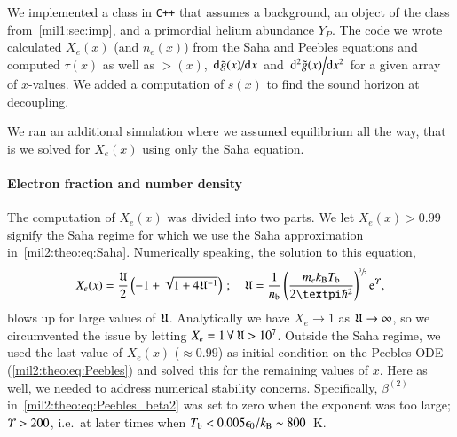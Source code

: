 

We implemented a class in \verb|C++| that assumes a background, an object of the class from~\cref{mil1:sec:imp}, and a primordial helium abundance $Y_P$. The code we wrote calculated $X_e(x)$ (and $n_e(x)$) from the Saha and Peebles equations and computed $\tau(x)$ as well as $\gt(x)$, $\dv*[]{\tilde{g}(x)}{x}$ and $\dv*[2]{\tilde{g}(x)}{x}$ for a given array of $x$-values. We added a computation of $s(x)$ to find the sound horizon at decoupling.

We ran an additional simulation where we assumed equilibrium all the way, that is we solved for $X_e(x)$ using only the Saha equation. 

\paragraph{Electron fraction and number density}
    The computation of $X_e(x)$ was divided into two parts. We let $X_e(x)>0.99$ signify the Saha regime for which we use the Saha approximation in~\cref{mil2:theo:eq:Saha}. Numerically speaking, the solution to this equation, 
    \begin{equation}\label{mil2:imp:eq:sol_Saha}
        X_e(x) = \frac{\expr}{2}\left( -1+\sqrt{1+4\expr^{-1}}\right)\,; \quad 
            \expr = \frac{1}{n\ped{b}} \left( \frac{m_e k\ped{B} T\ped{b} }{2\pi \hbar^2} \right)^{\sfrac{3}{2}} \eu^{\epskT},
    \end{equation}
    blows up for large values of $\mathfrak{U}$. Analytically we have $X_e\to 1$ as $\mathfrak{U}\to \infty$, so we circumvented the issue by letting $X_e=1 \,\forall\, \mathfrak{U} > 10^7$. Outside the Saha regime, we used the last value of $X_e(x)$ ($\approx 0.99$) as initial condition on the Peebles ODE (\cref{mil2:theo:eq:Peebles}) and solved this for the remaining values of $x$. Here as well, we needed to address numerical stability concerns. Specifically, $\beta^{(2)}$ in~\cref{mil2:theo:eq:Peebles_beta2} was set to zero when the exponent was too large; $\varUpsilon> 200$, i.e.~at later times when $T_\mathrm{b} < 0.005 \epsilon_0/k_\mathrm{B} \sim 800$~K. 
    

